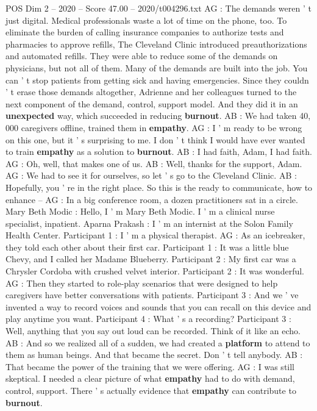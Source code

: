 \begin{textsample}{POS Dim 2 – 2020 – Score 47.00 – 2020/t004296.txt}
AG : The demands weren ' t just digital.
Medical professionals waste a lot of time on the phone, too.
To eliminate the burden of calling insurance companies to authorize tests and pharmacies to approve refills, The Cleveland Clinic introduced preauthorizations and automated refills.
They were able to reduce some of the demands on physicians, but not all of them.
Many of the demands are built into the job.
You can ' t stop patients from getting sick and having emergencies.
Since they couldn ' t erase those demands altogether, Adrienne and her colleagues turned to the next component of the demand, control, support model.
And they did it in an \textbf{unexpected} way, which succeeded in reducing \textbf{burnout}.
AB : We had taken 40, 000 caregivers offline, trained them in \textbf{empathy}.
AG : I ' m ready to be wrong on this one, but it ' s surprising to me.
I don ' t think I would have ever wanted to train \textbf{empathy} as a solution to \textbf{burnout}.
AB : I had faith, Adam, I had faith.
AG : Oh, well, that makes one of us.
AB : Well, thanks for the support, Adam.
AG : We had to see it for ourselves, so let ' s go to the Cleveland Clinic.
AB : Hopefully, you ' re in the right place.
So this is the ready to communicate, how to enhance -- AG : In a big conference room, a dozen practitioners sat in a circle.
Mary Beth Modic : Hello, I ' m Mary Beth Modic.
I ' m a clinical nurse specialist, inpatient.
Aparna Prakash : I ' m an internist at the Solon Family Health Center.
Participant 1 : I ' m a physical therapist.
AG : As an icebreaker, they told each other about their first car.
Participant 1 : It was a little blue Chevy, and I called her Madame Blueberry.
Participant 2 : My first car was a Chrysler Cordoba with crushed velvet interior.
Participant 2 : It was wonderful.
AG : Then they started to role-play scenarios that were designed to help caregivers have better conversations with patients.
Participant 3 : And we ' ve invented a way to record voices and sounds that you can recall on this device and play anytime you want.
Participant 4 : What ' s a recording?
Participant 3 : Well, anything that you say out loud can be recorded.
Think of it like an echo.
AB : And so we realized all of a sudden, we had created a \textbf{platform} to attend to them as human beings.
And that became the secret.
Don ' t tell anybody.
AB : That became the power of the training that we were offering.
AG : I was still skeptical.
I needed a clear picture of what \textbf{empathy} had to do with demand, control, support.
There ' s actually evidence that \textbf{empathy} can contribute to \textbf{burnout}.

\end{textsample}

